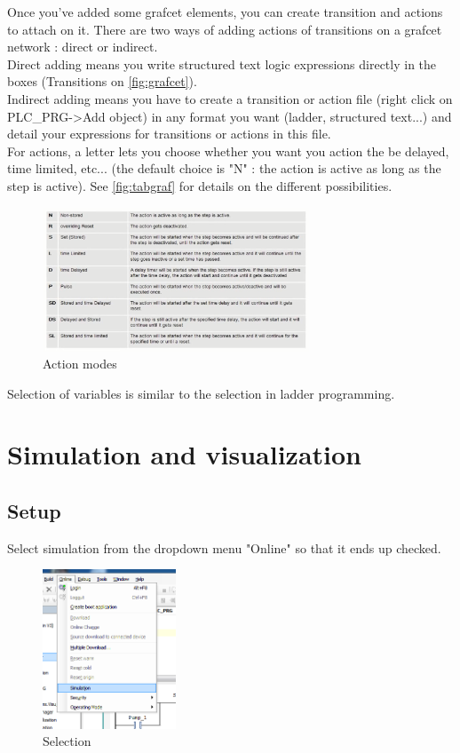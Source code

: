 \documentclass[10pt,a4paper]{article}
\begin{document}
Once you've added some grafcet elements, you can create transition and actions to attach on it.
There are two ways of adding actions of transitions on a grafcet network : direct or indirect.\\
Direct adding means you write structured text logic expressions directly in the boxes (Transitions on \vref{fig:grafcet}).\\
Indirect adding means you have to create a transition or action file (right click on PLC\_PRG->Add object) in any format you want (ladder, structured text...) and detail your expressions for transitions or actions in this file.\\
For actions, a letter lets you choose whether you want you action the be delayed, time limited, etc... (the default choice is "N" : the action is active as long as the step is active).
See \vref{fig:tabgraf} for details on the different possibilities.

\begin{figure}[h!]
	\begin{center}
		\includegraphics[width=300px]{tableaugrafcet.png}
	\end{center}
\caption{Action modes}
\label{fig:tabgraf}
\end{figure}


Selection of variables is similar to the selection in ladder programming.


\section{Simulation and visualization}
\subsection{Setup}
Select simulation from the dropdown menu "Online" so that it ends up checked.

\begin{figure}[h!]
	\begin{center}
		\includegraphics[width=150px]{img9.png}
	\end{center}
\caption{Selection}
\label{fig:simu}
\end{figure}
\end{document}
